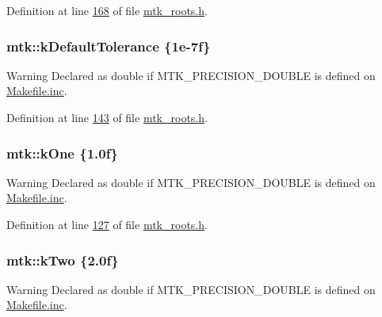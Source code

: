 Definition at line \hyperlink{mtk__roots_8h_source_l00168}{168} of file \hyperlink{mtk__roots_8h_source}{mtk\+\_\+roots.\+h}.

\hypertarget{group__c01-roots_gae914b125d81d1b97e0aee7bbc7739786}{
\subsubsection[{k\+Default\+Tolerance}]{\setlength{\rightskip}{0pt plus 5cm}mtk\+::k\+Default\+Tolerance \{1e-\/7f\}}}\label{group__c01-roots_gae914b125d81d1b97e0aee7bbc7739786}
\begin{DoxyWarning}{Warning}
Declared as double if M\+T\+K\+\_\+\+P\+R\+E\+C\+I\+S\+I\+O\+N\+\_\+\+D\+O\+U\+B\+L\+E is defined on \hyperlink{Makefile_8inc}{Makefile.\+inc}. 
\end{DoxyWarning}


Definition at line \hyperlink{mtk__roots_8h_source_l00143}{143} of file \hyperlink{mtk__roots_8h_source}{mtk\+\_\+roots.\+h}.

\hypertarget{group__c01-roots_ga26407c24d43b6b95480943340d285c71}{
\subsubsection[{k\+One}]{\setlength{\rightskip}{0pt plus 5cm}mtk\+::k\+One \{1.\+0f\}}}\label{group__c01-roots_ga26407c24d43b6b95480943340d285c71}
\begin{DoxyWarning}{Warning}
Declared as double if M\+T\+K\+\_\+\+P\+R\+E\+C\+I\+S\+I\+O\+N\+\_\+\+D\+O\+U\+B\+L\+E is defined on \hyperlink{Makefile_8inc}{Makefile.\+inc}. 
\end{DoxyWarning}


Definition at line \hyperlink{mtk__roots_8h_source_l00127}{127} of file \hyperlink{mtk__roots_8h_source}{mtk\+\_\+roots.\+h}.

\hypertarget{group__c01-roots_gaf39c2d851a2db744f4feb1c5ab3ec2cf}{
\subsubsection[{k\+Two}]{\setlength{\rightskip}{0pt plus 5cm}mtk\+::k\+Two \{2.\+0f\}}}\label{group__c01-roots_gaf39c2d851a2db744f4feb1c5ab3ec2cf}
\begin{DoxyWarning}{Warning}
Declared as double if M\+T\+K\+\_\+\+P\+R\+E\+C\+I\+S\+I\+O\+N\+\_\+\+D\+O\+U\+B\+L\+E is defined on \hyperlink{Makefile_8inc}{Makefile.\+inc}. 
\end{DoxyWarning}


